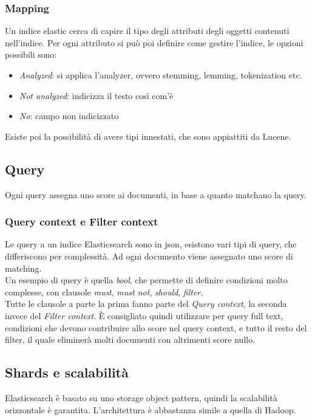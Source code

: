 \subsubsection{Mapping}
Un indice elastic cerca di capire il tipo degli attributi degli oggetti contenuti nell'indice.
Per ogni attributo si può poi definire come gestire l'indice, le opzioni possibili sono:
\begin{itemize}
    \item \emph{Analyzed}: si applica l'analyzer, ovvero stemming, lemming, tokenization etc.
    \item \emph{Not analyzed}: indicizza il testo così com'è
    \item \emph{No}: campo non indicizzato
\end{itemize}
Esiste poi la possibilità di avere tipi innestati, che sono appiattiti da Lucene.

\subsection{Query}
Ogni query assegna uno score ai documenti, in base a quanto matchano la query.

\subsubsection{Query context e Filter context}
Le query a un indice Elasticsearch sono in json, esistono vari tipi di query, che differiscono 
per complessità. Ad ogni documento viene assegnato uno score di matching.\\
Un esempio di query è quella \emph{bool}, che permette di definire condizioni molto 
complesse, con clausole \emph{must}, \emph{must not}, \emph{should}, \emph{filter}.\\
Tutte le clausole a parte la prima fanno parte del \emph{Query context}, la seconda invece 
del \emph{Filter context}. È consigliato quindi utilizzare per query full text, condizioni 
che devono contribuire allo score nel query context, e tutto il resto del filter, il quale 
eliminerà molti documenti con altrimenti score nullo.

\subsection{Shards e scalabilità}
Elasticsearch è basato su uno storage object pattern, quindi la scalabilità orizzontale
è garantita.
L'architettura è abbastanza simile a quella di Hadoop.

